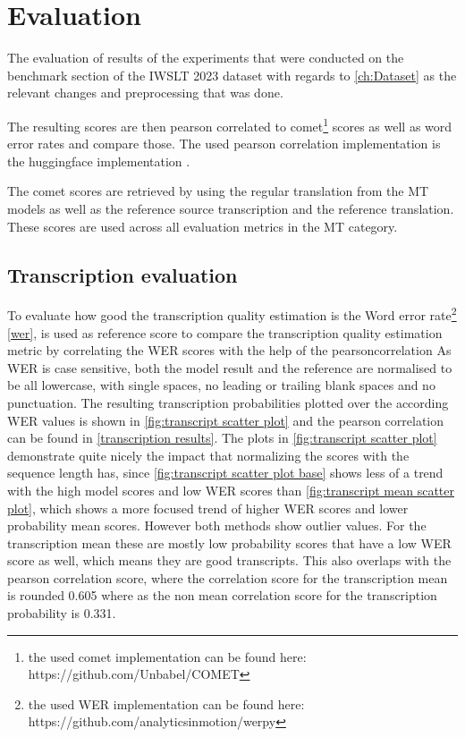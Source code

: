 
\chapter{Evaluation}
\label{ch:Evaluation}
The evaluation of results of the experiments that were conducted on the benchmark section of the IWSLT 2023 dataset \cite{sperber2024evaluating} with regards to \autoref{ch:Dataset} as the relevant changes and preprocessing that was done.

The resulting scores are then pearson correlated \cite{2020SciPy-NMeth} to comet\footnote{the used comet implementation can be found here: https://github.com/Unbabel/COMET} scores as well as word error rates and compare those. The used pearson correlation implementation is the huggingface implementation \cite{huggingfacepearsonr}.

The comet scores are retrieved by using the regular translation from the MT models as well as the reference source transcription and the reference translation. 
These scores are used across all evaluation metrics in the MT category. 

\section{Transcription evaluation}
To evaluate how good the transcription quality estimation is the Word error rate\footnote{the used WER implementation can be found here: https://github.com/analyticsinmotion/werpy} \autoref{wer}, is used as reference score to compare the transcription quality estimation metric by correlating the WER scores with the help of the pearsoncorrelation \cite{2020SciPy-NMeth}
As WER is case sensitive, both the model result and the reference are normalised to be all lowercase, with single spaces, no leading or trailing blank spaces and no punctuation.
The resulting transcription probabilities plotted over the according WER values is shown in \autoref{fig:transcript scatter plot} and the pearson correlation can be found in \autoref{transcription results}. 
The plots in \autoref{fig:transcript scatter plot} demonstrate quite nicely the impact that normalizing the scores with the sequence length has, since \autoref{fig:transcript scatter plot base} shows less of a trend with the high model scores and low WER scores than \autoref{fig:transcript mean scatter plot}, which shows a more focused trend of higher WER scores and lower probability mean scores. 
However both methods show outlier values. For the transcription mean these are mostly low probability scores that have a low WER score as well, which means they are good transcripts. 
This also overlaps with the pearson correlation score, where the correlation score for the transcription mean is rounded 0.605 where as the non mean correlation score for the transcription probability is 0.331. 

